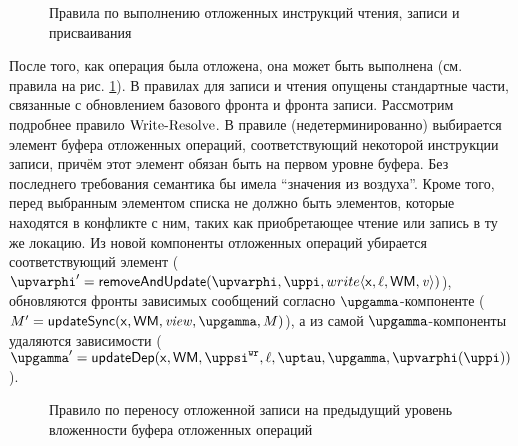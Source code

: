 \begin{figure}
\begin{mathpar}
\end{mathpar}
\caption{Правила по выполнению отложенных инструкций чтения, записи и присваивания}
\label{fig:resolve-sem}
\end{figure}

После того, как операция была отложена, она может быть выполнена (см. правила на рис. \ref{fig:resolve-sem}).
В правилах для записи и чтения опущены стандартные части, связанные с обновлением базового фронта и фронта записи.
Рассмотрим подробнее правило ${\rm Write\text{-}Resolve}$.
В правиле (недетерминированно) выбирается элемент буфера отложенных операций, соответствующий некоторой инструкции
записи, причём этот элемент обязан быть на первом уровне буфера. Без последнего требования семантика бы имела
``значения из воздуха''.
Кроме того, перед выбранным элементом списка не должно быть элементов, которые находятся в конфликте с ним,
таких как приобретающее чтение или запись в ту же локацию.
Из новой компоненты отложенных операций убирается соответствующий элемент
($\stPhi' = \remove(\stPhi, \stpath, write\angled{\vName, \loc, \WM, \mvalSubst})$),
обновляются фронты зависимых сообщений согласно $\stGamma$-компоненте
($\stEta' = \updateSync(\vName, \WM, \stSigma, \stGamma, \stEta)$),
а из самой $\stGamma$-компоненты удаляются зависимости
($\stGamma' = \updateDep(\vName, \WM, \stPsiWrite, \loc, \stTau, \stGamma, \stPhi(\stpath))$).

\begin{figure}
\begin{mathpar}
\end{mathpar}
\caption{Правило по переносу отложенной записи на предыдущий уровень вложенности буфера отложенных операций}
\label{fig:promote-sem}
\end{figure}

